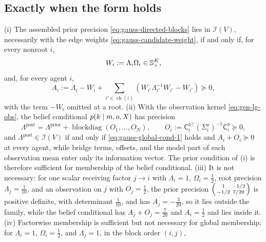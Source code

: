 \subsection{Exactly when the form holds}

(i) The assembled prior precision \eqref{eq:gauss-directed-blocks} lies in
\(\mathcal I(V)\), necessarily with the edge weights
\eqref{eq:gauss-candidate-weight}, if and only if, for every nonroot \(i\),
\begin{equation}
W_i:=\Lambda_i\Omega_i\in\mathbb S_{+}^{K},
\label{eq:gauss-global-cond-1}
\end{equation}
and, for every agent \(i\),
\begin{equation}
A_i:=\Lambda_i-W_i+\sum_{i'\in\operatorname{ch}(i)}\left(W_{i'}\Lambda_{i'}^{-1}W_{i'}-W_{i'}\right)\succeq0,
\label{eq:gauss-global-cond-2}
\end{equation}
with the term \(-W_i\) omitted at a root.
(ii) With the observation kernel \eqref{eq:gen-lg-obs}, the belief conditional
\(p(k\mid m,o,X)\) has precision
\begin{equation}
\Lambda^{\mathrm{post}}=\Lambda^{\mathrm{prior}}+\operatorname{blockdiag}(O_1,\dots,O_N),
\qquad
O_i:=\mathsf C_i^{b\top}(\Sigma_i^o)^{-1}\mathsf C_i^b\succeq0,
\label{eq:gauss-belief-conditional-precision}
\end{equation}
and \(\Lambda^{\mathrm{post}}\in\mathcal I(V)\) if and only if
\eqref{eq:gauss-global-cond-1} holds and \(A_i+O_i\succeq0\) at every agent,
while bridge terms, offsets, and the model part of each observation mean enter
only its information vector. The prior condition of (i) is therefore
sufficient for membership of the belief conditional.
(iii) It is not necessary: for one scalar receiving factor \(j\to i\) with
\(\Lambda_i=1\), \(\Omega_i=\tfrac12\), root precision \(\Lambda_j=\tfrac1{10}\),
and an observation on \(j\) with \(O_j=\tfrac12\), the prior precision
\(\begin{psmallmatrix}1&-1/2\\-1/2&7/20\end{psmallmatrix}\) is positive
definite, with determinant \(\tfrac1{10}\), and has
\(A_j=-\tfrac3{20}\), so it lies outside the family, while the belief
conditional has \(A_j+O_j=\tfrac7{20}\) and \(A_i=\tfrac12\) and lies inside it.
(iv) Factorwise membership is sufficient but not necessary for global
membership: for \(\Lambda_i=1\), \(\Omega_i=\tfrac12\), and \(\Lambda_j=1\), in
the block order \((i,j)\),
